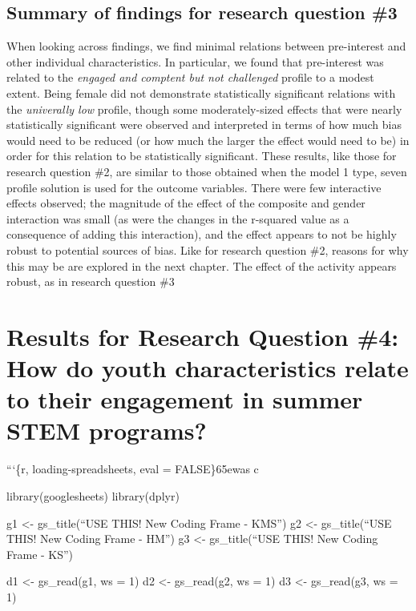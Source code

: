 \documentclass[]{book}
\theoremstyle{definition}
\theoremstyle{definition}
\theoremstyle{definition}
\theoremstyle{remark}
\begin{document}
\subsection{Summary of findings for research question
\#3}\label{summary-of-findings-for-research-question-3}

When looking across findings, we find minimal relations between
pre-interest and other individual characteristics. In particular, we
found that pre-interest was related to the \emph{engaged and comptent
but not challenged} profile to a modest extent. Being female did not
demonstrate statistically significant relations with the
\emph{univerally low} profile, though some moderately-sized effects that
were nearly statistically significant were observed and interpreted in
terms of how much bias would need to be reduced (or how much the larger
the effect would need to be) in order for this relation to be
statistically significant. These results, like those for research
question \#2, are similar to those obtained when the model 1 type, seven
profile solution is used for the outcome variables. There were few
interactive effects observed; the magnitude of the effect of the
composite and gender interaction was small (as were the changes in the
r-squared value as a consequence of adding this interaction), and the
effect appears to not be highly robust to potential sources of bias.
Like for research question \#2, reasons for why this may be are explored
in the next chapter. The effect of the activity appears robust, as in
research question \#3

\section{Results for Research Question \#4: How do youth characteristics
relate to their engagement in summer STEM
programs?}\label{results-for-research-question-4-how-do-youth-characteristics-relate-to-their-engagement-in-summer-stem-programs}

```\{r, loading-spreadsheets, eval = FALSE\}65ewas c

library(googlesheets) library(dplyr)

g1 \textless{}- gs\_title(``USE THIS! New Coding Frame - KMS'') g2
\textless{}- gs\_title(``USE THIS! New Coding Frame - HM'') g3
\textless{}- gs\_title(``USE THIS! New Coding Frame - KS'')

d1 \textless{}- gs\_read(g1, ws = 1) d2 \textless{}- gs\_read(g2, ws =
1) d3 \textless{}- gs\_read(g3, ws = 1)
\end{document}
